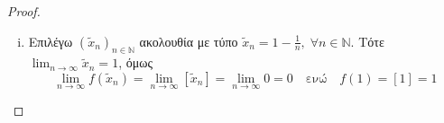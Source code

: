 \documentclass[main.tex]{subfiles}
\begin{document}
\begin{example}
\begin{enumerate}[wide,labelwidth=!,labelindent=0pt]
\begin{proof}
\begin{enumerate}[i.]
                    \item 
                        Επιλέγω $ {(\tilde{x}_{n})}_{ n \in \mathbb{N}} $ 
                        ακολουθία με τύπο 
                        $ \tilde{x}_{n} = 1 - \frac{1}{n}, \; \forall n \in 
                        \mathbb{N} $. Τότε
                        $ \lim_{n \to \infty} \tilde{x}_{n} = 1 $, όμως 
                        \[
                            \lim_{n \to \infty} f(\tilde{x}_{n}) = 
                            \lim_{n \to \infty} 
                            [\tilde{x}_{n}] = \lim_{n \to \infty} 0 = 0 \quad 
                            \text{ενώ} \quad  f(1) = [1] = 1 
                        \] 
                \end{enumerate}
            \end{proof}
    \end{enumerate}
\end{example}
\end{document}
